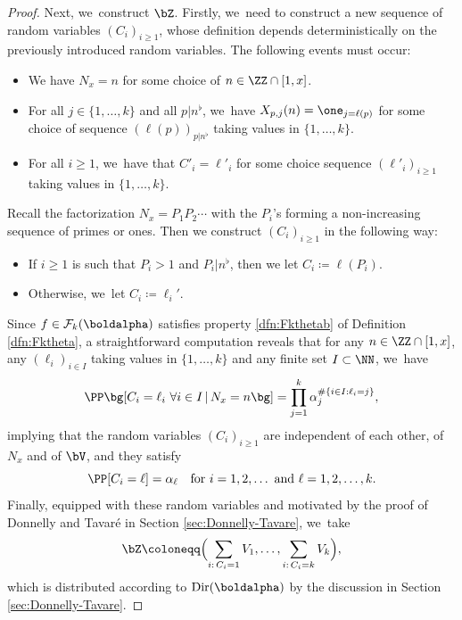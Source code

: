\begin{proof}
Next, we~construct $\bZ$. Firstly, we~need to construct a new sequence of random variables $(C_i)_{i\ge1}$, whose definition depends deterministically on the previously introduced random variables. The following events must occur:
\begin{itemize}
\item We have $N_x = n$ for some choice of $n \in \ZZ \cap [1, x]$.
\item For all $j \in \{1, \ldots, k\}$ and all $p|n^\flat$, we~have $X_{p, j}(n) = \one_{j=\ell(p)}$ for some choice of sequence $(\ell(p))_{p | n^\flat}$ taking values in $\{1, \ldots, k\}$.
\item For all $i \ge 1$, we~have that $C'_i = \ell'_i$ for some choice sequence $(\ell'_i)_{i \ge 1}$ taking values in $\{1, \ldots, k\}$.
\end{itemize}
Recall the factorization $N_x=P_1P_2\cdots$ with the $P_i$'s forming a non-increasing sequence of primes or ones. Then we construct $(C_i)_{i \ge 1}$ in the following way:
\begin{itemize}
\item If $i\ge1$ is such that $P_i > 1$ and $P_i|n^\flat$, then we let $C_i\coloneqq\ell(P_i)$.
\item Otherwise, we~let $C_i\coloneqq \ell_i'$.
\end{itemize}
Since $f\in\mathcal F_k(\boldalpha)$ satisfies property \eqref{dfn:Fkthetab} of Definition \ref{dfn:Fktheta}, a straightforward computation reveals that for any $n \in \ZZ \cap [1, x]$, any $(\ell_i)_{i \in I}$ taking values in $\{1, \ldots, k\}$ and any finite set $I \subset \NN$, we~have
\[
\PP\bg[C_i = \ell_i \ \forall i \in I\, |\,N_x = n\bg] = \prod_{j=1}^k \alpha_j^{\#\{i \in I : \ell_i = j\}},
\]
implying that the random variables $(C_i)_{i\ge1}$ are independent of each other, of $N_x$ and of $\bV$, and they satisfy
\[
\label{eq:C_i dfn}
\PP[C_i=\ell]=\alpha_\ell\quad\text{for}\ i=1,2,\dots\ \text{and}\ \ell=1,2,\dots,k.
\]
Finally, equipped with these random variables and motivated by the proof of Donnelly and Tavaré in Section \ref{sec:Donnelly-Tavare}, we~take
\[
\bZ \coloneqq \Bigl(\sum_{i:\, C_i=1} V_1, \ldots, \sum_{i:\, C_i=k} V_k \Bigr),
\]
which is distributed according to $\text{Dir}(\boldalpha)$ by the discussion in Section \ref{sec:Donnelly-Tavare}.


\end{proof}
